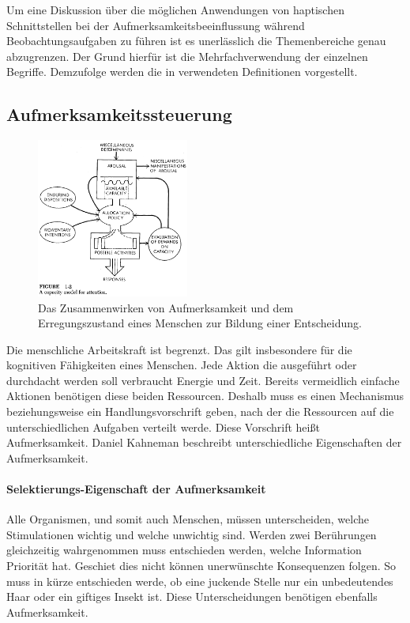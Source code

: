 \documentclass{llncs}					%
\begin{document}
Um eine Diskussion über die möglichen Anwendungen von haptischen Schnittstellen bei der Aufmerksamkeitsbeeinflussung während Beobachtungsaufgaben zu führen ist es unerlässlich die Themenbereiche genau abzugrenzen. Der Grund hierfür ist die Mehrfachverwendung der einzelnen Begriffe. Demzufolge werden die in verwendeten Definitionen vorgestellt.

\subsection{Aufmerksamkeitssteuerung}

\begin{figure}[htbp]
	\begin{center}
		\includegraphics[width = 5cm]{Grafiken/28-Attention-Model.png}
		\caption{Das Zusammenwirken von Aufmerksamkeit und dem Erregungszustand eines Menschen zur Bildung einer Entscheidung\cite{kahneman1973attention}.}
		\label{28-Attention-Model}
	\end{center}
\end{figure}

Die menschliche Arbeitskraft ist begrenzt. Das gilt insbesondere für die kognitiven Fähigkeiten eines Menschen. Jede Aktion die ausgeführt oder durchdacht werden soll verbraucht Energie und Zeit. Bereits vermeidlich einfache Aktionen benötigen diese beiden Ressourcen. Deshalb muss es einen Mechanismus beziehungsweise ein Handlungsvorschrift geben, nach der die Ressourcen auf die unterschiedlichen Aufgaben verteilt werde. Diese Vorschrift heißt Aufmerksamkeit.
 Daniel Kahneman \cite{kahneman1973attention} beschreibt unterschiedliche Eigenschaften der Aufmerksamkeit.
 
 	\paragraph{Selektierungs-Eigenschaft der Aufmerksamkeit}
 	Alle Organismen, und somit auch Menschen, müssen unterscheiden, welche Stimulationen wichtig und welche unwichtig sind. Werden zwei Berührungen gleichzeitig wahrgenommen muss entschieden werden, welche Information Priorität hat. Geschiet dies nicht können unerwünschte Konsequenzen folgen. So muss in kürze entschieden werde, ob eine juckende Stelle nur ein unbedeutendes Haar oder ein giftiges Insekt ist. Diese Unterscheidungen benötigen ebenfalls Aufmerksamkeit.
 	
\end{document}
